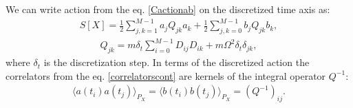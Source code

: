 \documentclass{article}
\begin{document}
We can write action from the eq$.$ \eqref{Cactionab} on the discretized time axis as: 
\begin{eqnarray}\label{oscaction}
    S[X] = \frac{1}{2}\sum_{j,k = 1}^{M-1} a_{j}Q_{jk}a_{k}+\frac{1}{2}\sum_{j,k=0}^{M-1} b_{j}Q_{jk}b_{k}, 
\end{eqnarray}
\begin{eqnarray}\label{matrixQ}
    Q_{jk} = m \delta_{t} \sum_{i=0}^{M-1}D_{ij}D_{ik} + m\Omega^{2}\delta_{t}\delta_{jk},
\end{eqnarray}
where $\delta_{t}$ is the discretization step. In terms of the discretized action the correlators from the eq$.$ \eqref{correlatorscont} are kernels of the integral operator $Q^{-1}$:
\begin{eqnarray}\label{disccorrelator}
    \langle a(t_{i})a(t_{j}) \rangle_{P_{X}} = \langle b(t_{i})b(t_{j}) \rangle_{P_{X}} = (Q^{-1})_{ij}.
\end{eqnarray}
\end{document}

